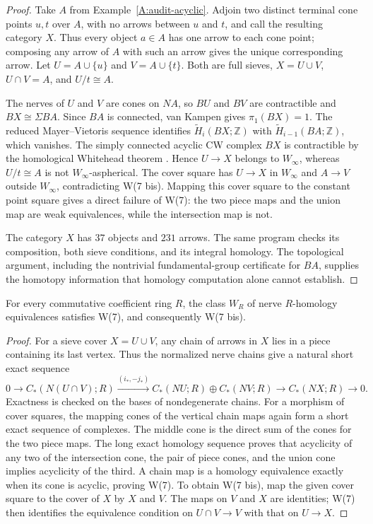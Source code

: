\begin{proof}
Take $A$ from Example~\ref{A:audit-acyclic}. Adjoin two distinct terminal cone points $u,t$ over $A$, with no arrows between $u$ and $t$, and call the resulting category $X$. Thus every object $a\in A$ has one arrow to each cone point; composing any arrow of $A$ with such an arrow gives the unique corresponding arrow. Let $U=A\cup\{u\}$ and $V=A\cup\{t\}$. Both are full sieves, $X=U\cup V$, $U\cap V=A$, and $U/t\cong A$.

The nerves of $U$ and $V$ are cones on $NA$, so $BU$ and $BV$ are contractible and $BX\cong\Sigma BA$. Since $BA$ is connected, van Kampen gives $\pi_1(BX)=1$. The reduced Mayer--Vietoris sequence identifies $\widetilde H_i(BX;\mathbb Z)$ with $\widetilde H_{i-1}(BA;\mathbb Z)$, which vanishes. The simply connected acyclic CW complex $BX$ is contractible by the homological Whitehead theorem \citep[Corollary~4.33, p.~367]{Hatcher2002}. Hence $U\to X$ belongs to $W_\infty$, whereas $U/t\cong A$ is not $W_\infty$-aspherical. The cover square has $U\to X$ in $W_\infty$ and $A\to V$ outside $W_\infty$, contradicting W(7 bis). Mapping this cover square to the constant point square gives a direct failure of W(7): the two piece maps and the union map are weak equivalences, while the intersection map is not.

The category $X$ has $37$ objects and $231$ arrows. The same program checks its composition, both sieve conditions, and its integral homology. The topological argument, including the nontrivial fundamental-group certificate for $BA$, supplies the homotopy information that homology computation alone cannot establish.
\end{proof}

\begin{proposition}\label{A:audit-homologygluing}
For every commutative coefficient ring $R$, the class $W_R$ of nerve $R$-homology equivalences satisfies W(7), and consequently W(7 bis).
\end{proposition}

\begin{proof}
For a sieve cover $X=U\cup V$, any chain of arrows in $X$ lies in a piece containing its last vertex. Thus the normalized nerve chains give a natural short exact sequence
\[
 0\longrightarrow C_*(N(U\cap V);R)
 \xrightarrow{(i_*,-j_*)}C_*(NU;R)\oplus C_*(NV;R)
 \longrightarrow C_*(NX;R)\longrightarrow0.
\]
Exactness is checked on the bases of nondegenerate chains. For a morphism of cover squares, the mapping cones of the vertical chain maps again form a short exact sequence of complexes. The middle cone is the direct sum of the cones for the two piece maps. The long exact homology sequence proves that acyclicity of any two of the intersection cone, the pair of piece cones, and the union cone implies acyclicity of the third. A chain map is a homology equivalence exactly when its cone is acyclic, proving W(7). To obtain W(7 bis), map the given cover square to the cover of $X$ by $X$ and $V$. The maps on $V$ and $X$ are identities; W(7) then identifies the equivalence condition on $U\cap V\to V$ with that on $U\to X$.
\end{proof}

